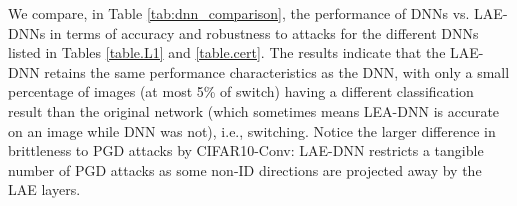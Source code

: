 We compare, in Table \ref{tab:dnn_comparison}, the performance of DNNs vs. LAE-DNNs in terms of accuracy and robustness to attacks for the different DNNs listed in Tables \ref{table.L1} and \ref{table.cert}. The results indicate that the LAE-DNN retains the same performance characteristics as the DNN, with only a small percentage of images (at most 5\% of switch) having a different classification result than the original network (which sometimes means LEA-DNN is accurate on an image while DNN was not), i.e., switching. Notice the larger difference in brittleness to PGD attacks by CIFAR10-Conv: LAE-DNN restricts
a tangible number of PGD attacks as some non-ID directions are projected away by the LAE layers.

